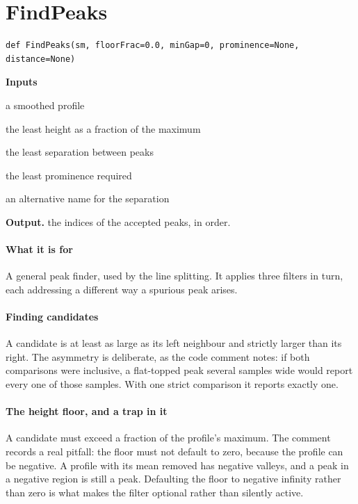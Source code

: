 \section{FindPeaks}
\begin{lstlisting}[style=sig]
def FindPeaks(sm, floorFrac=0.0, minGap=0, prominence=None, distance=None)
\end{lstlisting}

\noindent\textbf{Inputs}
\begin{description}[leftmargin=2.2em,style=nextline,font=\normalfont\ttfamily]\setlength\itemsep{1pt}
  \item[{sm}] \normalfont a smoothed profile
  \item[{floorFrac}] \normalfont the least height as a fraction of the maximum
  \item[{minGap}] \normalfont the least separation between peaks
  \item[{prominence}] \normalfont the least prominence required
  \item[{distance}] \normalfont an alternative name for the separation
\end{description}

\noindent\textbf{Output.} the indices of the accepted peaks, in order.


\paragraph{What it is for}
A general peak finder, used by the line splitting. It applies three filters in turn, each addressing a different way a spurious peak arises.


\paragraph{Finding candidates}
A candidate is at least as large as its left neighbour and strictly larger than its right. The asymmetry is deliberate, as the code comment notes: if both comparisons were inclusive, a flat-topped peak several samples wide would report every one of those samples. With one strict comparison it reports exactly one.


\paragraph{The height floor, and a trap in it}
A candidate must exceed a fraction of the profile's maximum. The comment records a real pitfall: the floor must not default to zero, because the profile can be negative. A profile with its mean removed has negative valleys, and a peak in a negative region is still a peak. Defaulting the floor to negative infinity rather than zero is what makes the filter optional rather than silently active.


